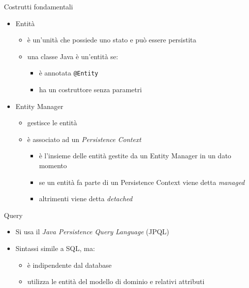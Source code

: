 \begin{frame}{Costrutti fondamentali}

\begin{itemize}
\item Entità
	\begin{itemize}
	\item è un'unità che possiede uno stato e può essere persistita
	\item una classe Java è un'entità se:
		\begin{itemize}
		\item è annotata \texttt{@Entity}
		\item ha un costruttore senza parametri
		\end{itemize}
	\end{itemize}

\vspace{1em}

\item Entity Manager
	\begin{itemize}
	\item gestisce le entità
	\item è associato ad un \textsl{Persistence Context}
		\begin{itemize}
		\item è l'insieme delle entità gestite da un Entity Manager in un dato momento
		\item se un entità fa parte di un Persistence Context viene detta \textsl{managed}
		\item altrimenti viene detta \textsl{detached}
		\end{itemize}
	\end{itemize}

\end{itemize}	


\end{frame}

\begin{frame}{Query}

\begin{itemize}
\item Si usa il \textsl{Java Persistence Query Language} (JPQL)

\vspace{1em}

\item Sintassi simile a SQL, ma:

	\begin{itemize}
	
	\vspace{0.5em}
	
	\item è indipendente dal database
	
	\vspace{0.8em}
	
	\item utilizza le entità del modello di dominio e relativi attributi
	\end{itemize}


\end{itemize}

\end{frame}


